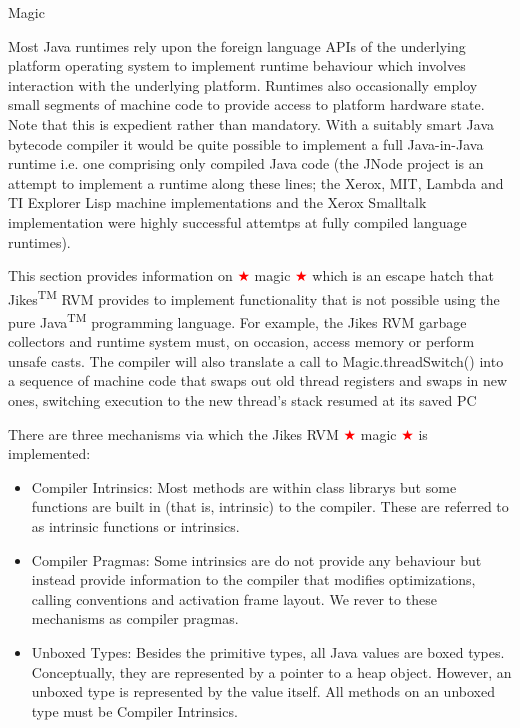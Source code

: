 \begin{chapter}{Magic}
\label{cha:magic}

Most Java runtimes rely upon the foreign language APIs of the underlying platform operating system to implement runtime behaviour which involves interaction with the underlying platform. Runtimes also occasionally employ small segments of machine code to provide access to platform hardware state. Note that this is expedient rather than mandatory. With a suitably smart Java bytecode compiler it would be quite possible to implement a full Java-in-Java runtime i.e. one comprising only compiled Java code (the JNode project is an attempt to implement a runtime along these lines; the Xerox, MIT, Lambda and TI Explorer Lisp machine implementations and the Xerox Smalltalk implementation were highly successful attemtps at fully compiled language runtimes).

This section provides information on \textcolor{red}{$\bigstar$} magic \textcolor{red}{$\bigstar$} which is an escape hatch that Jikes\textsuperscript{TM} RVM provides to implement functionality that is not possible using the pure Java\textsuperscript{TM} programming language. For example, the Jikes RVM garbage collectors and runtime system must, on occasion, access memory or perform unsafe casts. The compiler will also translate a call to Magic.threadSwitch() into a sequence of machine code that swaps out old thread registers and swaps in new ones, switching execution to the new thread's stack resumed at its saved PC

There are three mechanisms via which the Jikes RVM \textcolor{red}{$\bigstar$} magic \textcolor{red}{$\bigstar$} is implemented:
\begin{itemize}
  \item Compiler Intrinsics: Most methods are within class librarys but some functions are built in (that is, intrinsic) to the compiler. These are referred to as intrinsic functions or intrinsics.
  \item Compiler Pragmas: Some intrinsics are do not provide any behaviour but instead provide information to the compiler that modifies optimizations, calling conventions and activation frame layout. We rever to these mechanisms as compiler pragmas.
  \item Unboxed Types: Besides the primitive types, all Java values are boxed types. Conceptually, they are represented by a pointer to a heap object. However, an unboxed type is represented by the value itself. All methods on an unboxed type must be Compiler Intrinsics.
\end{itemize}


\end{chapter}
